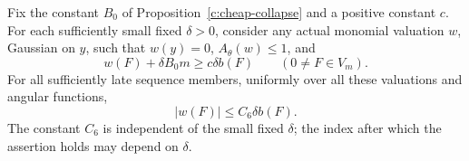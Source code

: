 \begin{proposition}\label{c:cheap-two-sided}
Fix the constant $B_0$ of Proposition~\ref{c:cheap-collapse} and a
positive constant $c$.  For each sufficiently small fixed
$\delta>0$, consider any actual monomial valuation $w$, Gaussian
on $y$, such that $w(y)=0$, $A_\theta(w)\le1$, and
\begin{equation}\label{eq:F3}
               w(F)+\delta B_0m\ge c\delta b(F)
               \qquad(0\ne F\in V_m).
\end{equation}
For all sufficiently late sequence members, uniformly over all
these valuations and angular functions,
\begin{equation}\label{eq:F4}
                        |w(F)|\le C_6\delta b(F).
\end{equation}
The constant $C_6$ is independent of the small fixed $\delta$;
the index after which the assertion holds may depend on $\delta$.
\end{proposition}


